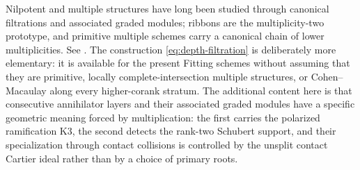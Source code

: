 \begin{remark}\label{rem:multiple-filtrations}
Nilpotent and multiple structures have long been studied through
canonical filtrations and associated graded modules; ribbons are the
multiplicity-two prototype, and primitive multiple schemes carry a
canonical chain of lower multiplicities.  See
\cite{BayerEisenbud,Manolache,Drezet}.  The construction
\eqref{eq:depth-filtration} is deliberately more elementary: it is
available for the present Fitting schemes without assuming that they
are primitive, locally complete-intersection multiple structures, or
Cohen--Macaulay along every higher-corank stratum.  The additional content here is that consecutive annihilator layers
and their associated graded modules have a specific geometric meaning
forced by multiplication: the first carries the polarized
ramification K3, the second detects the rank-two Schubert support, and
their specialization through contact collisions is controlled by the
unsplit contact Cartier ideal rather than by a choice of primary
roots.
\end{remark}
